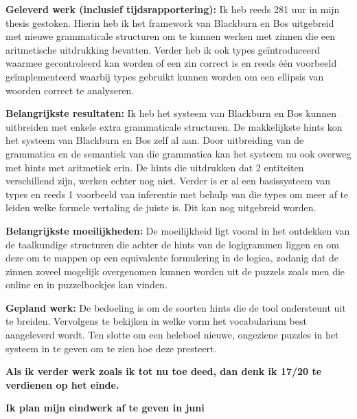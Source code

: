 \documentclass[12pt]{report}
\begin{document}
\vspace{1cm}
{\bf Geleverd werk (inclusief tijdsrapportering):}
Ik heb reeds 281 uur in mijn thesis gestoken. Hierin heb ik het framework van Blackburn en Bos uitgebreid met nieuwe grammaticale structuren om te kunnen werken met zinnen die een aritmetische uitdrukking bevatten. Verder heb ik ook types geïntroduceerd waarmee gecontroleerd kan worden of een zin correct is en reeds één voorbeeld geïmplementeerd waarbij types gebruikt kunnen worden om een ellipsis van woorden correct te analyseren.

\vspace{1cm}
{\bf Belangrijkste resultaten:}
Ik heb het systeem van Blackburn en Bos kunnen uitbreiden met enkele extra grammaticale structuren. De makkelijkste hints kon het systeem van Blackburn en Bos zelf al aan. Door uitbreiding van de grammatica en de semantiek van die grammatica kan het systeem nu ook overweg met hints met aritmetiek erin. De hints die uitdrukken dat 2 entiteiten verschillend zijn, werken echter nog niet.
Verder is er al een basissysteem van types en reeds 1 voorbeeld van inferentie met behulp van die types om meer af te leiden welke formele vertaling de juiste is. Dit kan nog uitgebreid worden.

\vspace{1cm}
{\bf Belangrijkste moeilijkheden:}
De moeilijkheid ligt vooral in het ontdekken van de taalkundige structuren die achter de hints van de logigrammen liggen en om deze om te mappen op een equivalente formulering in de logica, zodanig dat de zinnen zoveel mogelijk overgenomen kunnen worden uit de puzzels zoals men die online en in puzzelboekjes kan vinden.

\vspace{1cm}
{\bf Gepland werk:} 
De bedoeling is om de soorten hints die de tool ondersteunt uit te breiden. Vervolgens te bekijken in welke vorm het vocabularium best aangeleverd wordt. Ten slotte om een heleboel nieuwe, ongeziene puzzles in het systeem in te geven om te zien hoe deze presteert.

\vspace{1cm}
{\bf Als ik verder werk zoals ik tot nu toe deed, dan denk ik 17/20 te verdienen op het einde.}

{\bf Ik plan mijn eindwerk af te geven in juni}
\end{document}
